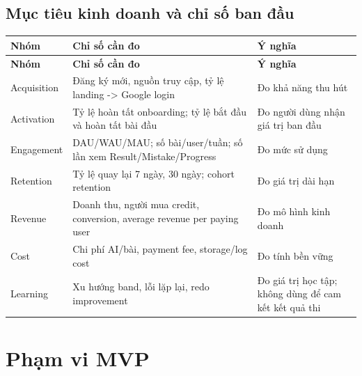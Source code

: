 \documentclass[11pt,a4paper]{article}
\begin{document}
\subsection{Mục tiêu kinh doanh và chỉ số ban đầu}
\small
\setlength{\tabcolsep}{4pt}
\renewcommand{\arraystretch}{1.18}
\begin{longtable}{|P{0.16\textwidth}|P{0.38\textwidth}|P{0.36\textwidth}|}
\hline
\textbf{Nhóm} & \textbf{Chỉ số cần đo} & \textbf{Ý nghĩa} \\ \hline
\endfirsthead
\hline
\textbf{Nhóm} & \textbf{Chỉ số cần đo} & \textbf{Ý nghĩa} \\ \hline
\endhead
Acquisition & Đăng ký mới, nguồn truy cập, tỷ lệ landing  ->  Google login & Đo khả năng thu hút \\ \hline
Activation & Tỷ lệ hoàn tất onboarding; tỷ lệ bắt đầu và hoàn tất bài đầu & Đo người dùng nhận giá trị ban đầu \\ \hline
Engagement & DAU/\allowbreak{}WAU/\allowbreak{}MAU; số bài/\allowbreak{}user/\allowbreak{}tuần; số lần xem Result/\allowbreak{}Mistake/\allowbreak{}Progress & Đo mức sử dụng \\ \hline
Retention & Tỷ lệ quay lại 7 ngày, 30 ngày; cohort retention & Đo giá trị dài hạn \\ \hline
Revenue & Doanh thu, người mua credit, conversion, average revenue per paying user & Đo mô hình kinh doanh \\ \hline
Cost & Chi phí AI/\allowbreak{}bài, payment fee, storage/\allowbreak{}log cost & Đo tính bền vững \\ \hline
Learning & Xu hướng band, lỗi lặp lại, redo improvement & Đo giá trị học tập; không dùng để cam kết kết quả thi \\ \hline
\end{longtable}
\normalsize
\section{Phạm vi MVP}
\end{document}
